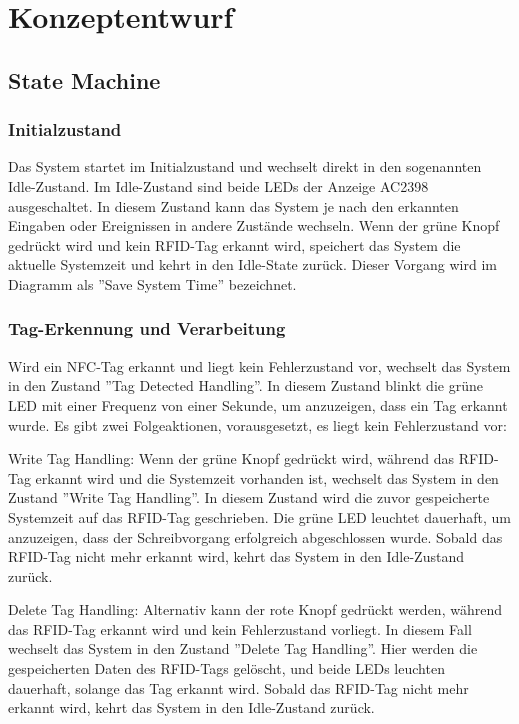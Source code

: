 \chapter*{Konzeptentwurf}
\label{cha:Konzeptentwurf}

\section*{State Machine}
\label{sec:State Machine}

\subsection*{Initialzustand}
\label{subsec:Initialzustand}

Das System startet im Initialzustand und wechselt direkt in den sogenannten Idle-Zustand. Im Idle-Zustand sind beide LEDs der Anzeige AC2398 ausgeschaltet. In diesem Zustand kann das System je nach den erkannten Eingaben oder Ereignissen in andere Zustände wechseln. Wenn der grüne Knopf gedrückt wird und kein RFID-Tag erkannt wird, speichert das System die aktuelle Systemzeit und kehrt in den Idle-State zurück. Dieser Vorgang wird im Diagramm als ''Save System Time'' bezeichnet.

\subsection*{Tag-Erkennung und Verarbeitung}
\label{subsec:Tag-ErkennungundVerarbeitung}

Wird ein NFC-Tag erkannt und liegt kein Fehlerzustand vor, wechselt das System in den Zustand ''Tag Detected Handling''. In diesem Zustand blinkt die grüne LED mit einer Frequenz von einer Sekunde, um anzuzeigen, dass ein Tag erkannt wurde. Es gibt zwei Folgeaktionen, vorausgesetzt, es liegt kein Fehlerzustand vor:

Write Tag Handling: Wenn der grüne Knopf gedrückt wird, während das RFID-Tag erkannt wird und die Systemzeit vorhanden ist, wechselt das System in den Zustand ''Write Tag Handling''. In diesem Zustand wird die zuvor gespeicherte Systemzeit auf das RFID-Tag geschrieben. Die grüne LED leuchtet dauerhaft, um anzuzeigen, dass der Schreibvorgang erfolgreich abgeschlossen wurde. Sobald das RFID-Tag nicht mehr erkannt wird, kehrt das System in den Idle-Zustand zurück.

Delete Tag Handling: Alternativ kann der rote Knopf gedrückt werden, während das RFID-Tag erkannt wird und kein Fehlerzustand vorliegt. In diesem Fall wechselt das System in den Zustand ''Delete Tag Handling''. Hier werden die gespeicherten Daten des RFID-Tags gelöscht, und beide LEDs leuchten dauerhaft, solange das Tag erkannt wird. Sobald das RFID-Tag nicht mehr erkannt wird, kehrt das System in den Idle-Zustand zurück.

